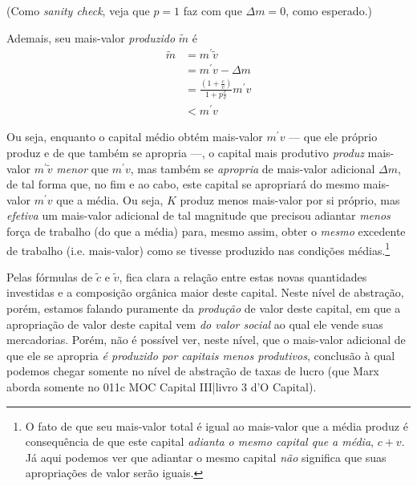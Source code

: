 (Como \textit{sanity check}, veja que $p=1$ faz com que $\Delta m=0$, como esperado.)

Ademais, seu mais-valor \textit{produzido} $\tilde{m}$ é 
\begin{align*}
\tilde{m} &= m^{\prime}\tilde{v}  \\
&= m^{\prime}v - \Delta m \\
&= \frac{\left( 1+\frac{c}{v} \right)}{1 + p \frac{c}{v}} m^{\prime} v  \\
&< m^{\prime}v
\end{align*}

Ou seja, enquanto o capital médio obtém mais-valor $m^{\prime}v$ — que ele próprio produz e de que também se apropria —, o capital mais produtivo \textit{produz} mais-valor $m^{\prime} \tilde{v}$ \textit{menor} que $m^{\prime}v$, mas também se \textit{apropria} de mais-valor adicional $\Delta m$, de tal forma que, no fim e ao cabo, este capital se apropriará do mesmo mais-valor $m^{\prime}v$ que a média. Ou seja, $K$ produz menos mais-valor por si próprio, mas \textit{efetiva} um mais-valor adicional de tal magnitude que precisou adiantar \textit{menos} força de trabalho (do que a média) para, mesmo assim, obter o \textit{mesmo} excedente de trabalho (i.e. mais-valor) como se tivesse produzido nas condições médias.\footnote{O fato de que seu mais-valor total é igual ao mais-valor que a média produz é consequência de que este capital \textit{adianta o mesmo capital que a média}, $c+v$. Já aqui podemos ver que adiantar o mesmo capital \textit{não} significa que suas apropriações de valor serão iguais.}

Pelas fórmulas de $\tilde{c}$ e $\tilde{v}$, fica clara a relação entre estas novas quantidades investidas e a composição orgânica maior deste capital. Neste nível de abstração, porém, estamos falando puramente da \textit{produção} de valor deste capital, em que a apropriação de valor deste capital vem \textit{do valor social} ao qual ele vende suas mercadorias. Porém, não é possível ver, neste nível, que o mais-valor adicional de que ele se apropria \textit{é produzido por capitais menos produtivos}, conclusão à qual podemos chegar somente no nível de abstração de taxas de lucro (que Marx aborda somente no 011c MOC Capital III|livro 3 d'O Capital). 

